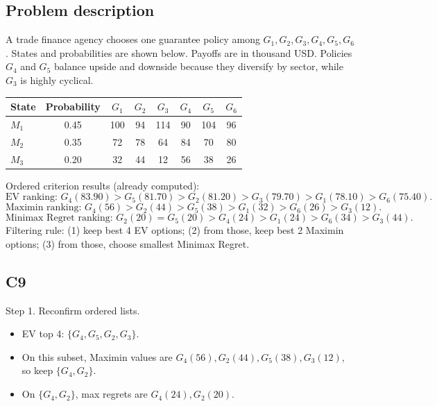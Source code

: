 \begin{ExamProblems}
		\subsection*{Problem description}
		A trade finance agency chooses one guarantee policy among $G_1,G_2,G_3,G_4,G_5,G_6$. States and probabilities are shown below.
		Payoffs are in thousand USD. Policies $G_4$ and $G_5$ balance upside and downside because they diversify by sector, while $G_3$ is highly cyclical.
		\begin{center}
			\begin{tabular}{l c c c c c c c}
				\toprule
				State & Probability & $G_1$ & $G_2$ & $G_3$ & $G_4$ & $G_5$ & $G_6$ \\
				\midrule
				$M_1$ & 0.45 & 100 & 94 & 114 & 90 & 104 & 96 \\
				$M_2$ & 0.35 & 72 & 78 & 64 & 84 & 70 & 80 \\
				$M_3$ & 0.20 & 32 & 44 & 12 & 56 & 38 & 26 \\
				\bottomrule
			\end{tabular}
		\end{center}
		Ordered criterion results (already computed):
		\[
		\text{EV ranking: }G_4(83.90)>G_5(81.70)>G_2(81.20)>G_3(79.70)>G_1(78.10)>G_6(75.40).
		\]
		\[
		\text{Maximin ranking: }G_4(56)>G_2(44)>G_5(38)>G_1(32)>G_6(26)>G_3(12).
		\]
		\[
		\text{Minimax Regret ranking: }G_2(20)=G_5(20)>G_4(24)>G_1(24)>G_6(34)>G_3(44).
		\]
		Filtering rule:
		(1) keep best 4 EV options;
		(2) from those, keep best 2 Maximin options;
		(3) from those, choose smallest Minimax Regret.

		\subsection*{C9}
		Step 1. Reconfirm ordered lists.
		\begin{itemize}
			\item EV top 4: $\{G_4,G_5,G_2,G_3\}$.
			\item On this subset, Maximin values are $G_4(56),G_2(44),G_5(38),G_3(12)$, so keep $\{G_4,G_2\}$.
			\item On $\{G_4,G_2\}$, max regrets are $G_4(24),G_2(20)$.
		\end{itemize}


\end{ExamProblems}
